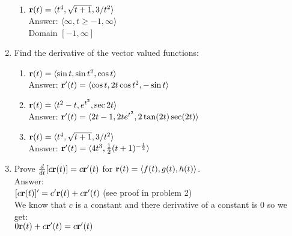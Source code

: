 \documentclass[11pt]{article}
\begin{document}
\begin{enumerate}
\begin{enumerate}
        \item ${\bf r}(t) = \langle t^4, \sqrt{t+1}, 3/t^2 \rangle$
        \\
        Answer: $\langle \infty, t \ge -1, \infty \rangle$
        \\
        Domain $[-1, \infty]$
    \end{enumerate}



\item Find the derivative of the vector valued functions:
    \begin{enumerate}
        \item ${\bf r}(t) = \langle \sin t, \sin t^2, \cos t \rangle$
        \\
        Answer: ${\bf r}'(t) = \langle \cos t, 2t \cos t^2, -\sin t \rangle$
        \item ${\bf r}(t) = \langle t^2-t, e^{t^2}, \sec 2t \rangle$
        \\
        Answer: ${\bf r}'(t) = \langle 2t-1, 2te^{t^2}, 2 \tan (2t) \sec (2t) \rangle $
        \\
        \item ${\bf r}(t) = \langle t^4, \sqrt{t+1}, 3/t^2 \rangle$
        \\
        Answer: ${\bf r}'(t) = \langle 4t^3, \frac{1}{2}(t+1)^{-\frac{1}{2}}\rangle$
    \end{enumerate}
    
    
    
    \item Prove $\frac{d}{dt} [c {\bf r}(t) ] = c {\bf r}'(t)$ for  ${\bf r}(t) = \langle f(t), g(t), h(t) \rangle$.
    \\
    Answer: 
    \\
    $ [c {\bf r}(t) ]'= c' {\bf r}(t) +   c {\bf r}'(t) $ (see proof in problem 2)
    \\
    We know that $c$ is a constant and there derivative of a constant is $0$ so we get: 
    \\
    $0 {\bf r}(t) +   c {\bf r}'(t)=  c {\bf r}'(t)$
    
    

\end{enumerate}
\end{document}
